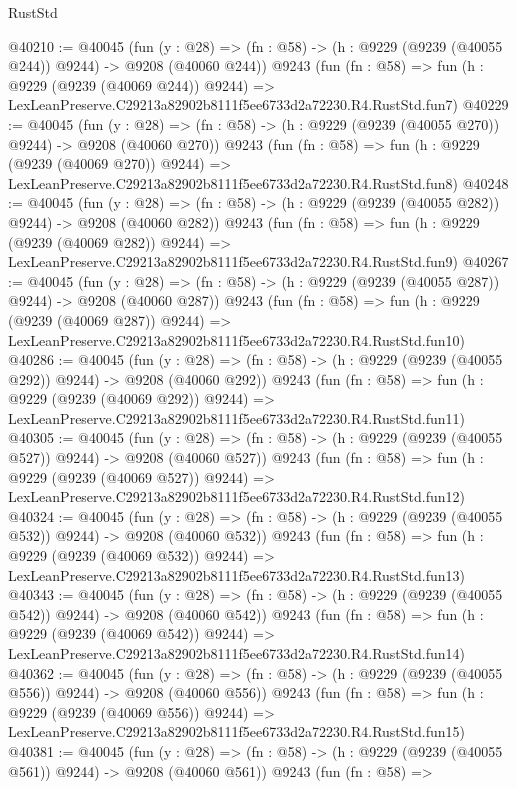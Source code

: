 \begin{lexlean}{RustStd}
\begin{coremodule}
@40210 := @40045
    (fun (y : @28) => (fn : @58) -> (h : @9229 (@9239 (@40055 @244)) @9244) -> @9208 (@40060 @244))
    @9243
    (fun (fn : @58) =>
    fun (h : @9229 (@9239 (@40069 @244)) @9244) =>
    LexLeanPreserve.C29213a82902b8111f5ee6733d2a72230.R4.RustStd.fun7)
@40229 := @40045
    (fun (y : @28) => (fn : @58) -> (h : @9229 (@9239 (@40055 @270)) @9244) -> @9208 (@40060 @270))
    @9243
    (fun (fn : @58) =>
    fun (h : @9229 (@9239 (@40069 @270)) @9244) =>
    LexLeanPreserve.C29213a82902b8111f5ee6733d2a72230.R4.RustStd.fun8)
@40248 := @40045
    (fun (y : @28) => (fn : @58) -> (h : @9229 (@9239 (@40055 @282)) @9244) -> @9208 (@40060 @282))
    @9243
    (fun (fn : @58) =>
    fun (h : @9229 (@9239 (@40069 @282)) @9244) =>
    LexLeanPreserve.C29213a82902b8111f5ee6733d2a72230.R4.RustStd.fun9)
@40267 := @40045
    (fun (y : @28) => (fn : @58) -> (h : @9229 (@9239 (@40055 @287)) @9244) -> @9208 (@40060 @287))
    @9243
    (fun (fn : @58) =>
    fun (h : @9229 (@9239 (@40069 @287)) @9244) =>
    LexLeanPreserve.C29213a82902b8111f5ee6733d2a72230.R4.RustStd.fun10)
@40286 := @40045
    (fun (y : @28) => (fn : @58) -> (h : @9229 (@9239 (@40055 @292)) @9244) -> @9208 (@40060 @292))
    @9243
    (fun (fn : @58) =>
    fun (h : @9229 (@9239 (@40069 @292)) @9244) =>
    LexLeanPreserve.C29213a82902b8111f5ee6733d2a72230.R4.RustStd.fun11)
@40305 := @40045
    (fun (y : @28) => (fn : @58) -> (h : @9229 (@9239 (@40055 @527)) @9244) -> @9208 (@40060 @527))
    @9243
    (fun (fn : @58) =>
    fun (h : @9229 (@9239 (@40069 @527)) @9244) =>
    LexLeanPreserve.C29213a82902b8111f5ee6733d2a72230.R4.RustStd.fun12)
@40324 := @40045
    (fun (y : @28) => (fn : @58) -> (h : @9229 (@9239 (@40055 @532)) @9244) -> @9208 (@40060 @532))
    @9243
    (fun (fn : @58) =>
    fun (h : @9229 (@9239 (@40069 @532)) @9244) =>
    LexLeanPreserve.C29213a82902b8111f5ee6733d2a72230.R4.RustStd.fun13)
@40343 := @40045
    (fun (y : @28) => (fn : @58) -> (h : @9229 (@9239 (@40055 @542)) @9244) -> @9208 (@40060 @542))
    @9243
    (fun (fn : @58) =>
    fun (h : @9229 (@9239 (@40069 @542)) @9244) =>
    LexLeanPreserve.C29213a82902b8111f5ee6733d2a72230.R4.RustStd.fun14)
@40362 := @40045
    (fun (y : @28) => (fn : @58) -> (h : @9229 (@9239 (@40055 @556)) @9244) -> @9208 (@40060 @556))
    @9243
    (fun (fn : @58) =>
    fun (h : @9229 (@9239 (@40069 @556)) @9244) =>
    LexLeanPreserve.C29213a82902b8111f5ee6733d2a72230.R4.RustStd.fun15)
@40381 := @40045
    (fun (y : @28) => (fn : @58) -> (h : @9229 (@9239 (@40055 @561)) @9244) -> @9208 (@40060 @561))
    @9243
    (fun (fn : @58) =>

\end{coremodule}
\end{lexlean}
